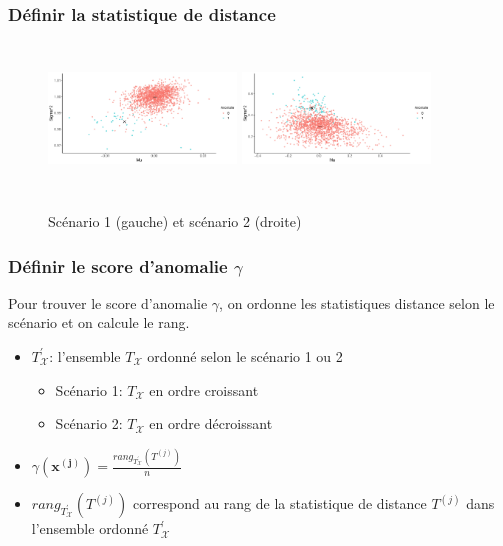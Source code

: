 \documentclass{beamer}
\begin{document}
	\begin{frame}
		\frametitle{Définir la statistique de distance}
		\begin{figure}
			\centering
			\includegraphics[width=5cm, height=4cm]{../rapports/images/plot_near.pdf}
			\includegraphics[width=5cm, height=4cm]{../rapports/images/plot_away.pdf}
			\caption{Scénario 1 (gauche) et scénario 2 (droite)}
		\end{figure}
		
	\end{frame}

	\begin{frame}
		\frametitle{Définir le score d'anomalie $\gamma$}
		 Pour trouver le score d'anomalie $\gamma$, on ordonne les statistiques distance selon le scénario et on calcule le rang.
		 \begin{itemize}
		 	\item $T^{'}_{\mathcal{X}}$: l'ensemble $T_{\mathcal{X}}$ ordonné selon le scénario 1 ou 2
		 		\begin{itemize}
		 			\item Scénario 1: $T_{\mathcal{X}}$ en ordre croissant
		 			\item Scénario 2: $T_{\mathcal{X}}$ en ordre décroissant
		 		\end{itemize}
	 		\item $\gamma(\boldsymbol{x^{(j)}}) = \frac{rang_{T^{'}_{\mathcal{X}}}(T^{(j)})}{n}$
	 		\item $rang_{T^{'}_{\mathcal{X}}}(T^{(j)})$ correspond au rang de la statistique de distance $T^{(j)}$ dans l'ensemble ordonné $T^{'}_{\mathcal{X}}$
		 \end{itemize}
		
	\end{frame}
\end{document}
